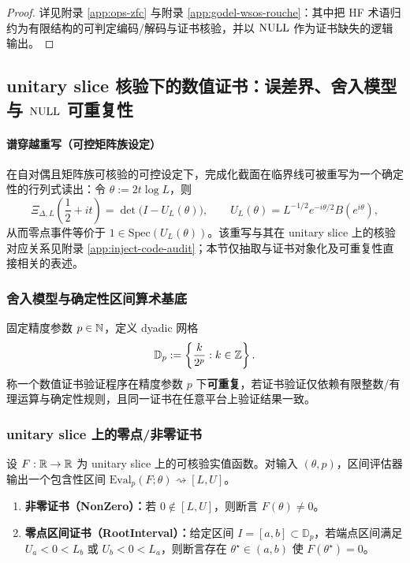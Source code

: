 \begin{proof}
详见附录 \ref{app:ops-zfc} 与附录 \ref{app:godel-wsos-rouche}：其中把 HF 术语归约为有限结构的可判定编码/解码与证书核验，并以 $\mathrm{NULL}$ 作为证书缺失的逻辑输出。
\end{proof}

\subsection{unitary slice 核验下的数值证书：误差界、舍入模型与 \texorpdfstring{$\mathrm{NULL}$}{NULL} 可重复性}\label{subsec:cc-us-cert}

\paragraph{谱穿越重写（可控矩阵族设定）}
在自对偶且矩阵族可核验的可控设定下，完成化截面在临界线可被重写为一个确定性的行列式读出：令 $\theta:=2t\log L$，则
$$
\Xi_{\Delta,L}\!\left(\frac12+it\right)=\det\!\bigl(I-U_L(\theta)\bigr),
\qquad
U_L(\theta)=L^{-1/2}e^{-i\theta/2}B(e^{i\theta}),
$$
从而零点事件等价于 $1\in\mathrm{Spec}(U_L(\theta))$。该重写与其在 unitary slice 上的核验对应关系见附录 \ref{app:inject-code-audit}；本节仅抽取与证书对象化及可重复性直接相关的表述。

\subsubsection{舍入模型与确定性区间算术基底}
\begin{definition}\label{def:cc-repro}
固定精度参数 $p\in\mathbb{N}$，定义 dyadic 网格
$$
\mathbb{D}_p := \left\{\frac{k}{2^p}:k\in\mathbb{Z}\right\}.
$$
称一个数值证书验证程序在精度参数 $p$ 下\textbf{可重复}，若证书验证仅依赖有限整数/有理运算与确定性规则，且同一证书在任意平台上验证结果一致。
\end{definition}

\subsubsection{unitary slice 上的零点/非零证书}
\begin{definition}[两类区间证书]\label{def:cc-interval-certs}
设 $F:\mathbb{R}\to\mathbb{R}$ 为 unitary slice 上的可核验实值函数。对输入 $(\theta,p)$，区间评估器输出一个包含性区间
$
\mathrm{Eval}_p(F;\theta)\rightsquigarrow [L,U]
$。
\begin{enumerate}
  \item \textbf{非零证书（NonZero）：}若 $0\notin[L,U]$，则断言 $F(\theta)\neq 0$。
  \item \textbf{零点区间证书（RootInterval）：}给定区间 $I=[a,b]\subset\mathbb{D}_p$，若端点区间满足 $U_a<0<L_b$ 或 $U_b<0<L_a$，则断言存在 $\theta^\star\in(a,b)$ 使 $F(\theta^\star)=0$。
\end{enumerate}
\end{definition}

